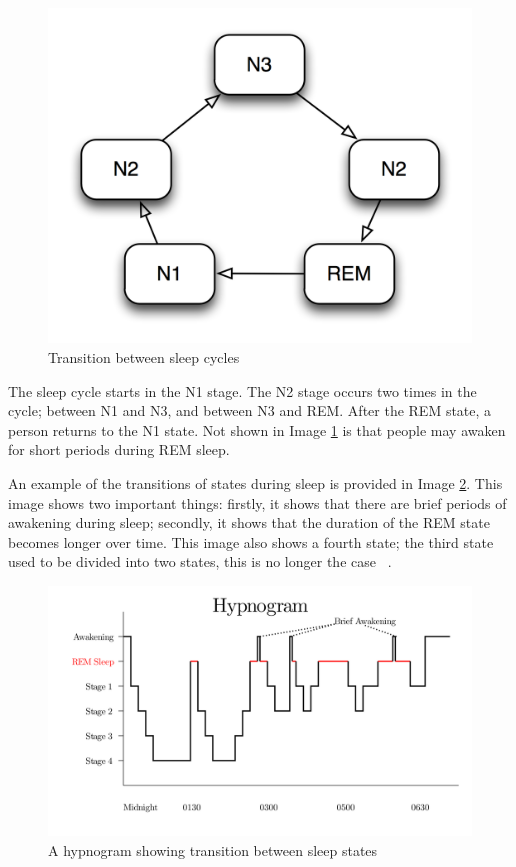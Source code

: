\begin{figure}[htbp]
  \centering
    \includegraphics[scale=1]{images/sleep_cycle.png}
  \caption{Transition between sleep cycles}
  \label{fig:images_sleep_cycle}
\end{figure}

The sleep cycle starts in the N1 stage. The N2 stage occurs two times in the cycle; between N1 and N3, and between N3 and REM. After the REM state, a person returns to the N1 state. Not shown in Image \ref{fig:images_sleep_cycle} is that people may awaken for short periods during REM sleep.

An example of the transitions of states during sleep is provided in Image \ref{fig:hypnogram}. This image shows two important things: firstly, it shows that there are brief periods of awakening during sleep; secondly, it shows that the duration of the REM state becomes longer over time. This image also shows a fourth state; the third state used to be divided into two states, this is no longer the case ~\cite{Silber:2007fk}.

\begin{figure}[htbp]
  \centering
    \includegraphics[width=\textwidth]{images/hypnogram.png}
  \caption{A hypnogram showing transition between sleep states ~\cite{RazerM:2011uq}}
  \label{fig:hypnogram}
\end{figure}

